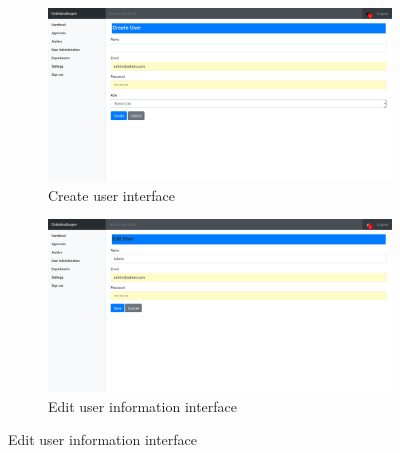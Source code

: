 \begin{figure}[H]
	\centering
	\begin{subfigure}[b]{0.48\textwidth}
		\includegraphics[width=\textwidth]{billeder/iteration2Prototyper/CreateU.png}
		\caption{Create user interface}
		\label{fig:4-CreateU}
	\end{subfigure}
	\quad
	\begin{subfigure}[b]{0.48\textwidth}
		\includegraphics[width=\textwidth]{billeder/iteration2Prototyper/EditU.png}
		\caption{Edit user information interface}
		\label{fig:4-EditU}
	\end{subfigure}
\end{figure}
